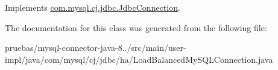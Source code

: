 Implements \mbox{\hyperlink{interfacecom_1_1mysql_1_1cj_1_1jdbc_1_1_jdbc_connection_a6d078258f83ddc438d64bafb0f665004}{com.\+mysql.\+cj.\+jdbc.\+Jdbc\+Connection}}.



The documentation for this class was generated from the following file\+:\begin{DoxyCompactItemize}
\item 
pruebas/mysql-\/connector-\/java-\/8../src/main/user-\/impl/java/com/mysql/cj/jdbc/ha/Load\+Balanced\+My\+S\+Q\+L\+Connection.\+java\end{DoxyCompactItemize}
